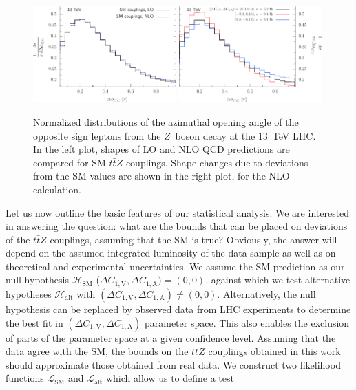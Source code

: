 \documentclass{JHEP3}
\newcommand{\SM}{\mathrm{SM}}
\newcommand{\alt}{\mathrm{alt}}
\def\ttbZ{t\bar{t}Z}
\def\DConeA{\Delta C_{1,\mathrm{A}}}
\def\DConeV{\Delta C_{1,\mathrm{V}}}
\def\Halt{\mathcal{H}_{\mathrm{alt}}}
\begin{document}
\begin{figure}[t]
\centering 
\includegraphics[width=0.49\textwidth]{./LHC_53_Fig17a.pdf}
\hfill
\includegraphics[width=0.49\textwidth]{./LHC_53_Fig17b.pdf}
\caption{\label{fig:vi}
Normalized distributions of the azimuthal opening angle of the opposite sign leptons from the $Z$~boson decay at the 13~TeV LHC.
In the left plot, shapes of LO and NLO QCD predictions are compared for SM $\ttbZ$ couplings.
Shape changes due to deviations from the SM values are shown in the right plot, for the NLO calculation.}
\end{figure}
Let us now outline the basic features of our statistical analysis.
We are interested in answering the question: what are the bounds that can be placed on deviations of the $\ttbZ$ couplings, assuming that the SM is true?
Obviously, the answer will depend on the assumed integrated luminosity of the data sample as well as on theoretical and experimental uncertainties. 
We assume the SM prediction as our null hypothesis 
$\mathcal{H}_{\mathrm{SM}}$ ($\DConeV,\DConeA)=(0,0)$,
against which we test alternative hypotheses $\Halt$ with $(\DConeV,\DConeA) \ne (0,0)$.
Alternatively, the null hypothesis can be replaced by observed data from LHC experiments to determine the best fit in $(\DConeV,\DConeA)$ parameter space.
This also enables the exclusion of parts of the parameter space at a given confidence level. 
Assuming that the data agree with the SM, 
the bounds on the $\ttbZ$ couplings 
obtained in this work should approximate those obtained from real data. 
We construct two likelihood functions $\mathcal{L}_{\SM}$ and $\mathcal{L}_{\alt}$ which allow us to define a test 
\end{document}
